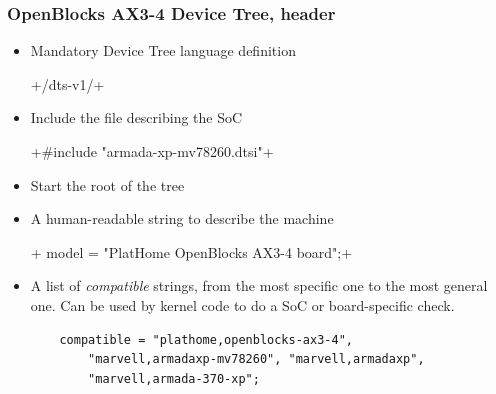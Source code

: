 \begin{frame}[fragile]
  \frametitle{OpenBlocks AX3-4 Device Tree, header}
  \begin{itemize}
  \item Mandatory Device Tree language definition\\
    \begin{block}{} +/dts-v1/+ \end{block}
  \item Include the  file describing the SoC\\
    \begin{block}{} +#include "armada-xp-mv78260.dtsi"+ \end{block}
  \item Start the root of the tree\\
    \begin{block}{} +/ {+ \end{block}
  \item A human-readable string to describe the machine\\
    \begin{block}{} +  model = "PlatHome OpenBlocks AX3-4 board";+ \end{block}
  \item A list of {\em compatible} strings, from the most specific one
    to the most general one. Can be used by kernel code to do a SoC or
    board-specific check.\\
    \begin{block}{}
    \begin{verbatim}
    compatible = "plathome,openblocks-ax3-4",
        "marvell,armadaxp-mv78260", "marvell,armadaxp",
        "marvell,armada-370-xp";
      \end{verbatim}
    \end{block}
  \end{itemize}
\end{frame}

